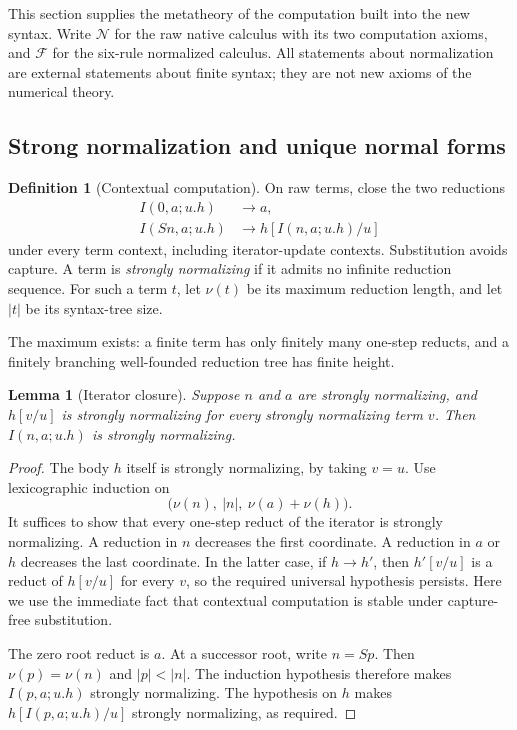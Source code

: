 \documentclass[11pt,letterpaper]{article}
\newtheorem{lemma}[theorem]{Lemma}
\theoremstyle{definition}
\newtheorem{definition}[theorem]{Definition}
\theoremstyle{remark}
\begin{document}
This section supplies the metatheory of the computation built into the
new syntax.  Write $\mathcal N$ for the raw native calculus with its two
computation axioms, and $\mathcal F$ for the six-rule normalized calculus.
All statements about normalization are external statements about finite
syntax; they are not new axioms of the numerical theory.

\subsection{Strong normalization and unique normal forms}

\begin{definition}[Contextual computation]
On raw terms, close the two reductions
\begin{equation}
\begin{aligned}
 I(0,a;u.h)&\longrightarrow a,\\
 I(Sn,a;u.h)&\longrightarrow h[I(n,a;u.h)/u]
\end{aligned}
\label{eq:fullnf-reductions}
\end{equation}
under every term context, including iterator-update contexts.  Substitution
avoids capture.  A term is \emph{strongly normalizing} if it admits no
infinite reduction sequence.  For such a term $t$, let $\nu(t)$ be its
maximum reduction length, and let $|t|$ be its syntax-tree size.
\end{definition}

The maximum exists: a finite term has only finitely many one-step reducts,
and a finitely branching well-founded reduction tree has finite height.

\begin{lemma}[Iterator closure]
\label{lem:fullnf-closure}
Suppose $n$ and $a$ are strongly normalizing, and $h[v/u]$ is strongly
normalizing for every strongly normalizing term $v$.  Then
$I(n,a;u.h)$ is strongly normalizing.
\end{lemma}
\begin{proof}
The body $h$ itself is strongly normalizing, by taking $v=u$.
Use lexicographic induction on
\[
  \bigl(\nu(n),\ |n|,\ \nu(a)+\nu(h)\bigr).
\]
It suffices to show that every one-step reduct of the iterator is strongly
normalizing.  A reduction in $n$ decreases the first coordinate.  A reduction
in $a$ or $h$ decreases the last coordinate.  In the latter case, if
$h\longrightarrow h'$, then $h'[v/u]$ is a reduct of $h[v/u]$ for every
$v$, so the required universal hypothesis persists.  Here we use the
immediate fact that contextual computation is stable under capture-free
substitution.

The zero root reduct is $a$.  At a successor root, write $n=Sp$.
Then $\nu(p)=\nu(n)$ and $|p|<|n|$.  The induction hypothesis therefore
makes $I(p,a;u.h)$ strongly normalizing.  The hypothesis on $h$ makes
$h[I(p,a;u.h)/u]$ strongly normalizing, as required.
\end{proof}
\end{document}
